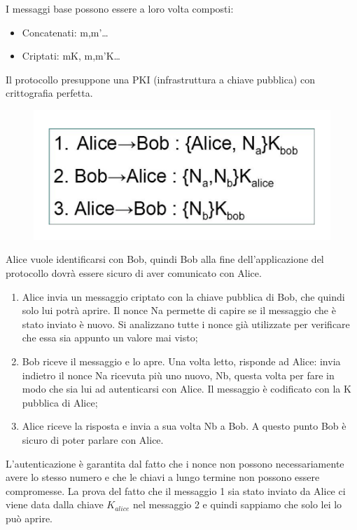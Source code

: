I messaggi base possono essere a loro volta composti:
\begin{itemize}
    \item Concatenati: m,m’…
    \item Criptati: mK, {m,m’}K…
\end{itemize}

Il protocollo presuppone una PKI (infrastruttura a chiave pubblica)
con crittografia perfetta.

\begin{figure}[H]
    \centering
    \includegraphics[width=\textwidth, keepaspectratio]{capitoli/crittografia/imgs/alieno.png}
\end{figure}

Alice vuole identificarsi con Bob, quindi Bob alla fine dell’applicazione del protocollo dovrà essere
sicuro di aver comunicato con Alice.
\begin{enumerate}
    \item Alice invia un messaggio criptato con la
          chiave pubblica di Bob, che quindi solo lui potrà
          aprire. Il nonce Na permette di capire se il
          messaggio che è stato inviato è nuovo. Si
          analizzano tutte i nonce già utilizzate per
          verificare che essa sia appunto un valore mai
          visto;
    \item Bob riceve il messaggio e lo apre. Una volta
          letto, risponde ad Alice: invia indietro il nonce
          Na ricevuta più uno nuovo, Nb, questa volta
          per fare in modo che sia lui ad autenticarsi con
          Alice. Il messaggio è codificato con la K
          pubblica di Alice;
    \item Alice riceve la risposta e invia a sua volta
          Nb a Bob. A questo punto Bob è sicuro di poter
          parlare con Alice.
\end{enumerate}

L’autenticazione è garantita dal fatto che i nonce non
possono necessariamente avere lo stesso
numero e che le chiavi a lungo termine non possono
essere compromesse.
La prova del fatto che il messaggio 1 sia stato inviato
da Alice ci viene data dalla chiave \(K_{alice}\) nel
messaggio 2 e quindi sappiamo che solo lei lo può aprire.

